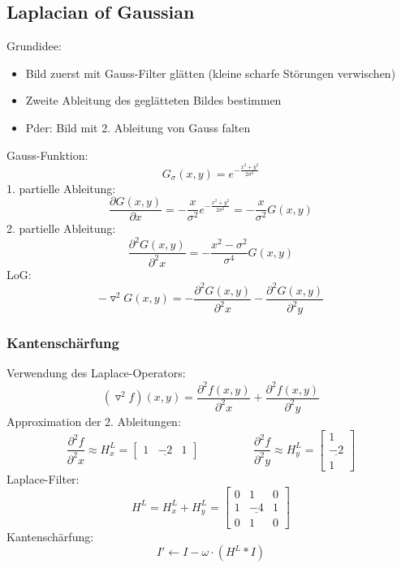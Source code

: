 \documentclass[10pt]{article}
\begin{document}
\subsection{Laplacian of Gaussian}
Grundidee:
\begin{itemize}
	\item Bild zuerst mit Gauss-Filter glätten (kleine scharfe Störungen verwischen)
	\item Zweite Ableitung des geglätteten Bildes bestimmen
	\item Pder: Bild mit 2. Ableitung von Gauss falten
\end{itemize}
Gauss-Funktion:
\begin{equation*}
	G_\sigma(x,y) = e^{-\frac{x^2+y^2}{2\sigma^2}}
\end{equation*}
1. partielle Ableitung:
\begin{equation*}
	\frac{\partial G(x,y)}{\partial x} = - \frac{x}{\sigma^2}e^{-\frac{x^2+y^2}{2\sigma^2}} = - \frac{x}{\sigma^2}G(x,y)
\end{equation*}
2. partielle Ableitung:
\begin{equation*}
	\frac{\partial^2 G(x,y)}{\partial^2 x} = - \frac{x^2 - \sigma^2}{\sigma^4}G(x,y)
\end{equation*}
LoG:
\begin{equation*}
	-\triangledown^2 G(x,y) = - \frac{\partial^2 G(x,y)}{\partial^2 x} - \frac{\partial^2 G(x,y)}{\partial^2 y} 
\end{equation*}

\subsubsection{Kantenschärfung}
Verwendung des Laplace-Operators:
\begin{equation*}
	(\triangledown^2 f)(x,y) = \frac{\partial^2 f(x,y)}{\partial^2 x} + \frac{\partial^2 f(x,y)}{\partial^2 y} 
\end{equation*}
Approximation der 2. Ableitungen:
\begin{equation*}
	\frac{\partial^2f}{\partial^2x} \approx H^L_x = \begin{bmatrix} 1 & \underline{-2} & 1\end{bmatrix}
	\hspace{2cm}
	\frac{\partial^2f}{\partial^2y} \approx H^L_y = \begin{bmatrix} 1 \\ \underline{-2} \\ 1\end{bmatrix}
\end{equation*}
Laplace-Filter:
\begin{equation*}
	H^L=H^L_x + H^L_y = \begin{bmatrix}
	0 & 1 & 0 \\
	1 & \underline{-4} & 1 \\
	0 & 1 & 0
	\end{bmatrix}
\end{equation*}
Kantenschärfung:
\begin{equation*}
	I' \leftarrow I - \omega \cdot (H^L * I)
\end{equation*}
\end{document}
